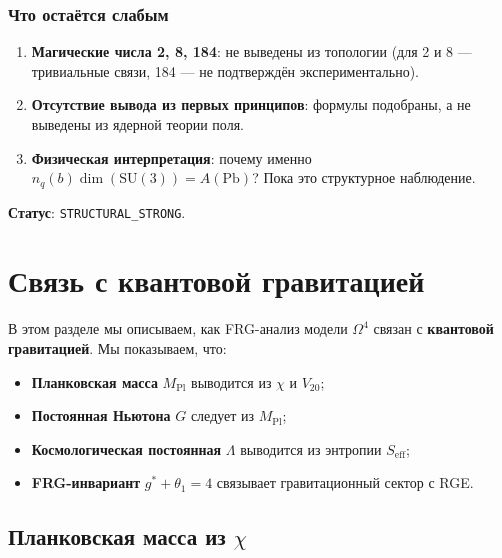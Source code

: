 \documentclass[11pt,a4paper]{article}
\newcommand{\SU}{\ensuremath{\mathrm{SU}}}
\newcommand{\Om}{\ensuremath{\Omega^4}}
\theoremstyle{definition}
\begin{document}
\subsubsection{Что остаётся слабым}

\begin{enumerate}
    \item \textbf{Магические числа 2, 8, 184}: не выведены
          из топологии (для 2 и 8 --- тривиальные связи,
          184 --- не подтверждён экспериментально).
    \item \textbf{Отсутствие вывода из первых принципов}: формулы
          подобраны, а не выведены из ядерной теории поля.
    \item \textbf{Физическая интерпретация}: почему именно
          $n_q(b) \dim(\SU(3)) = A(\text{Pb})$?
          Пока это структурное наблюдение.
\end{enumerate}

\medskip\noindent
\textbf{Статус}: \texttt{STRUCTURAL\_STRONG}.
\section{Связь с квантовой гравитацией}
\label{sec:quantum-gravity}

В этом разделе мы описываем, как FRG-анализ модели $\Om$
связан с \textbf{квантовой гравитацией}. Мы показываем, что:
\begin{itemize}
    \item \textbf{Планковская масса} $M_{\text{Pl}}$ выводится
          из $\chi$ и $V_{20}$;
    \item \textbf{Постоянная Ньютона} $G$ следует из $M_{\text{Pl}}$;
    \item \textbf{Космологическая постоянная} $\Lambda$ выводится
          из энтропии $S_{\text{eff}}$;
    \item \textbf{FRG-инвариант} $g^* + \theta_1 = 4$ связывает
          гравитационный сектор с RGE.
\end{itemize}

\subsection{Планковская масса из \texorpdfstring{$\chi$}{}}
\label{subsec:qg-planck}
\end{document}

